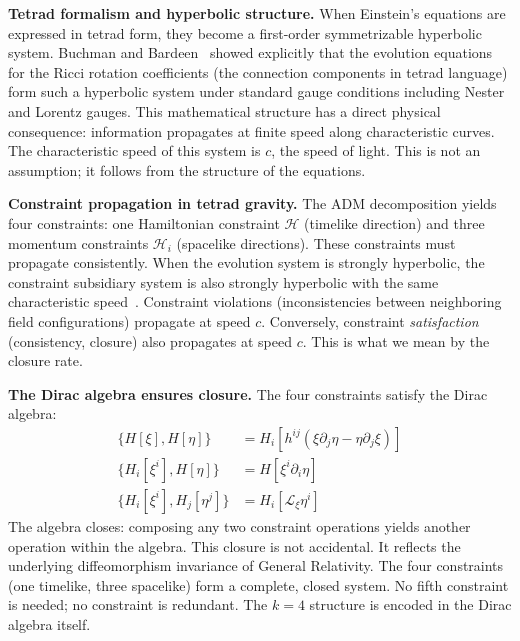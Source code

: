 \documentclass[aps,prd,preprint,superscriptaddress,showpacs,preprintnumbers,amsmath,amssymb,nofootinbib]{revtex4-2}
\begin{document}
\textbf{Tetrad formalism and hyperbolic structure.} When Einstein's equations are expressed in tetrad form, they become a first-order symmetrizable hyperbolic system. Buchman and Bardeen~\cite{buchman2003} showed explicitly that the evolution equations for the Ricci rotation coefficients (the connection components in tetrad language) form such a hyperbolic system under standard gauge conditions including Nester and Lorentz gauges. This mathematical structure has a direct physical consequence: information propagates at finite speed along characteristic curves. The characteristic speed of this system is $c$, the speed of light. This is not an assumption; it follows from the structure of the equations.

\textbf{Constraint propagation in tetrad gravity.} The ADM decomposition yields four constraints: one Hamiltonian constraint $\mathcal{H}$ (timelike direction) and three momentum constraints $\mathcal{H}_i$ (spacelike directions). These constraints must propagate consistently. When the evolution system is strongly hyperbolic, the constraint subsidiary system is also strongly hyperbolic with the same characteristic speed~\cite{mtw1973}. Constraint violations (inconsistencies between neighboring field configurations) propagate at speed $c$. Conversely, constraint \emph{satisfaction} (consistency, closure) also propagates at speed $c$. This is what we mean by the closure rate.

\textbf{The Dirac algebra ensures closure.} The four constraints satisfy the Dirac algebra:
\begin{align}
\{H[\xi], H[\eta]\} &= H_i[h^{ij}(\xi \partial_j \eta - \eta \partial_j \xi)] \nonumber \\
\{H_i[\xi^i], H[\eta]\} &= H[\xi^i \partial_i \eta] \nonumber \\
\{H_i[\xi^i], H_j[\eta^j]\} &= H_i[\mathcal{L}_\xi \eta^i]
\label{eq:dirac-algebra}
\end{align}
The algebra closes: composing any two constraint operations yields another operation within the algebra. This closure is not accidental. It reflects the underlying diffeomorphism invariance of General Relativity. The four constraints (one timelike, three spacelike) form a complete, closed system. No fifth constraint is needed; no constraint is redundant. The $k=4$ structure is encoded in the Dirac algebra itself.
\end{document}
